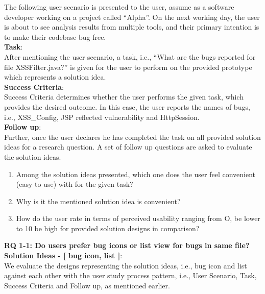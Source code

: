 The following user scenario is presented to the user, assume as a software developer working on a project called “Alpha”. On the next working day, the user is about to see analysis results from multiple tools, and their primary intention is to make their codebase bug free. \\

\textbf{Task}: \\

After mentioning the user scenario, a task, i.e., “What are the bugs reported for file XSSFilter.java?” is given for the user to perform on the provided prototype which represents a solution idea. \\

\textbf{Success Criteria}: \\

Success Criteria determines whether the user performs the given task, which provides the desired outcome. In this case, the user reports the names of bugs, i.e., XSS\_Config, JSP reflected vulnerability and HttpSession. \\

\textbf{Follow up}: \\

Further, once the user declares he has completed the task on all provided solution ideas for a research question. A set of follow up questions are asked to evaluate the solution ideas. \\

\begin{enumerate}
\item Among the solution ideas presented, which one does the user feel convenient (easy to use) with for the given task?
\item Why is it the mentioned solution idea is convenient?
\item How do the user rate in terms of perceived usability ranging from O, be lower to 10 be high for provided solution designs in comparison? \\
\end{enumerate}

\noindent \textbf{RQ 1-1: Do users prefer bug icons or list view for bugs in same file?} \\

\textbf{Solution Ideas - [ bug icon, list ]}: \\

We evaluate the designs representing the solution ideas, i.e., bug icon and list against each other with the user study process pattern, i.e., User Scenario, Task, Success Criteria and Follow up, as mentioned earlier. \\

